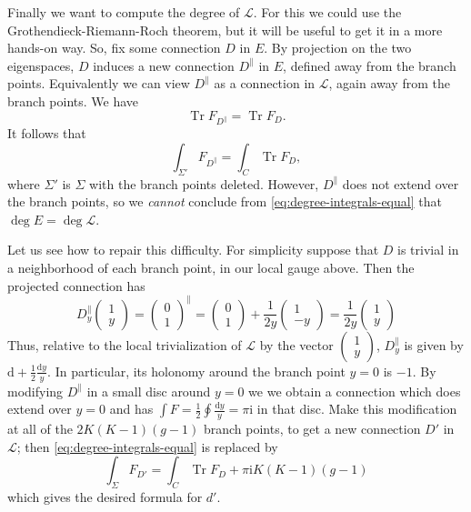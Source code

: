 \documentclass[12pt,letterpaper,reqno]{article}
\numberwithin{equation}{section}
\newcommand{\cL}{\ensuremath{\mathcal L}}
\newcommand{\half}{\ensuremath{\frac{1}{2}}}
\newcommand{\I}{{\mathrm i}}
\newcommand{\de}{\mathrm{d}}
\newcommand{\ti}[1]{\textit{#1}}
\DeclareMathOperator{\Tr}{Tr}
\begin{document}
\begin{pf}
Finally we want to compute the degree of $\cL$.
For this we could use the Grothendieck-Riemann-Roch theorem,
but it will be useful to get it in a more hands-on way. 
So, fix some connection $D$ in $E$.
By projection on the two eigenspaces, $D$ induces a new
connection $D^\parallel$ in $E$, defined away from the branch points.
Equivalently we can view $D^\parallel$ as a connection in $\cL$,
again away from the branch points. We have
\begin{equation}
   \Tr F_{D^\parallel} = \Tr F_D.
\end{equation}
It follows that 
\begin{equation} \label{eq:degree-integrals-equal}
  \int_{\Sigma'} F_{D^\parallel} = \int_C \Tr F_D,
\end{equation}
where $\Sigma'$ is $\Sigma$ with the branch points deleted.
However, $D^\parallel$ does not extend 
over the branch points, so we \ti{cannot} conclude 
from \eqref{eq:degree-integrals-equal} that
$\deg E = \deg \cL$.

Let us see how to repair this difficulty.
For simplicity suppose that 
$D$ is trivial in a neighborhood of each branch point,
in our local gauge above. Then the projected connection
has
\begin{equation}
 D^\parallel_y \begin{pmatrix} 1 \\ y \end{pmatrix} = \begin{pmatrix} 0 \\ 1 \end{pmatrix}^\parallel = \begin{pmatrix} 0 \\ 1 \end{pmatrix} + \frac{1}{2y} \begin{pmatrix} 1 \\ -y \end{pmatrix} = \frac{1}{2y} \begin{pmatrix} 1 \\ y \end{pmatrix}
\end{equation}
Thus, relative to the local trivialization of $\cL$ by the
vector $\begin{pmatrix} 1 \\ y \end{pmatrix}$, $D_y^\parallel$
is given by $\de + \frac{1}{2} \frac{\de y}{y}$.
In particular, its holonomy around the branch point $y=0$
is $-1$.
By modifying $D^\parallel$ in a small disc around $y=0$
we we obtain a connection which does extend over $y = 0$ 
and has $\int F = \half \oint \frac{\de y}{y} = \pi \I$ in that disc.
Make this modification at all of the $2K(K-1)(g-1)$ branch points,
to get a new connection $D'$ in $\cL$;
then \eqref{eq:degree-integrals-equal} is replaced by
\begin{equation}
\int_{\Sigma} F_{D'} = \int_C \Tr F_D + \pi \I K(K-1)(g-1)
\end{equation}
which gives the desired formula for $d'$.


\end{pf}
\end{document}
